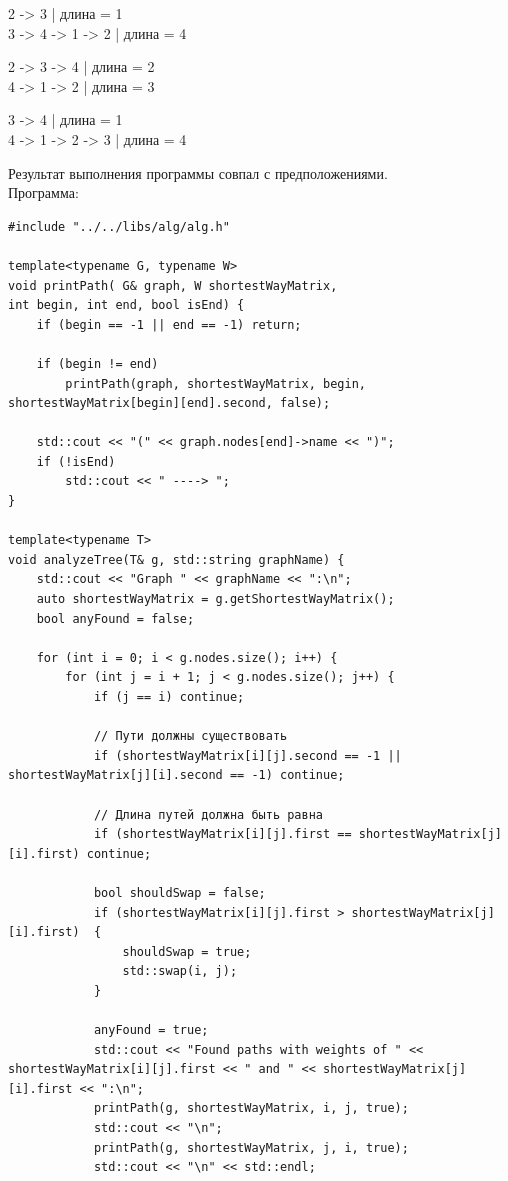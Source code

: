 \documentclass[a4paper,14pt]{extarticle}
\begin{document}
\begin{enumerate}[1.]
        2 -> 3 | длина = 1\\
        3 -> 4 -> 1 -> 2 | длина = 4\bigbreak

        2 -> 3 -> 4 | длина = 2\\
        4 -> 1 -> 2 | длина = 3\bigbreak

        3 -> 4 | длина = 1\\
        4 -> 1 -> 2 -> 3 | длина = 4\bigbreak

        Результат выполнения программы совпал с предположениями.\\

        Программа:
        \begin{verbatim}
#include "../../libs/alg/alg.h"

template<typename G, typename W>
void printPath( G& graph, W shortestWayMatrix, 
int begin, int end, bool isEnd) {
    if (begin == -1 || end == -1) return;

    if (begin != end)
        printPath(graph, shortestWayMatrix, begin, shortestWayMatrix[begin][end].second, false);

    std::cout << "(" << graph.nodes[end]->name << ")";
    if (!isEnd)
        std::cout << " ----> ";
}

template<typename T>
void analyzeTree(T& g, std::string graphName) {
    std::cout << "Graph " << graphName << ":\n";
    auto shortestWayMatrix = g.getShortestWayMatrix();
    bool anyFound = false;
    
    for (int i = 0; i < g.nodes.size(); i++) {
        for (int j = i + 1; j < g.nodes.size(); j++) {
            if (j == i) continue;

            // Пути должны существовать
            if (shortestWayMatrix[i][j].second == -1 || shortestWayMatrix[j][i].second == -1) continue;

            // Длина путей должна быть равна
            if (shortestWayMatrix[i][j].first == shortestWayMatrix[j][i].first) continue;

            bool shouldSwap = false;
            if (shortestWayMatrix[i][j].first > shortestWayMatrix[j][i].first)  {
                shouldSwap = true;
                std::swap(i, j);
            }
        
            anyFound = true;
            std::cout << "Found paths with weights of " << shortestWayMatrix[i][j].first << " and " << shortestWayMatrix[j][i].first << ":\n";
            printPath(g, shortestWayMatrix, i, j, true);
            std::cout << "\n";
            printPath(g, shortestWayMatrix, j, i, true);
            std::cout << "\n" << std::endl;


\end{verbatim}
\end{enumerate}
\end{document}
